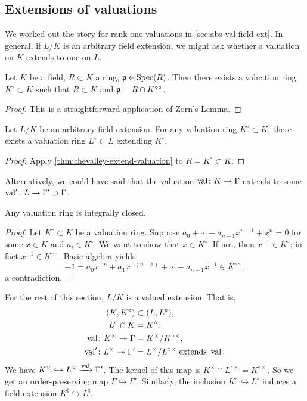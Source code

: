 \subsection{Extensions of valuations}

We worked out the story for rank-one valuations in 
\autoref{sec:abs-val-field-ext}. In general, if $L/K$ is an arbitrary field 
extension, we might ask whether a valuation on $K$ extends to one on $L$. 

\begin{theorem}[Chevalley]\label{thm:chevalley-extend-valuation}
Let $K$ be a field, $R\subset K$ a ring, $\mathfrak{p}\in \operatorname{Spec}(R)$. Then there exists a 
valuation ring $K^\circ\subset K$ such that $R\subset K$ and 
$\mathfrak{p}=R\cap K^{\circ\circ}$. 
\end{theorem}
\begin{proof}
This is a straightforward application of Zorn's Lemma.
\end{proof}

\begin{corollary}
Let $L/K$ be an arbitrary field extension. For any valuation ring 
$K^\circ\subset K$, there exists a valuation ring $L^\circ\subset L$ extending 
$K^\circ$. 
\end{corollary}
\begin{proof}
Apply \autoref{thm:chevalley-extend-valuation} to $R=K^\circ\subset K$. 
\end{proof}

Alternatively, we could have said that the valuation 
$\operatorname{val}\colon K\to \Gamma$ extends to some 
$\operatorname{val}'\colon L\to \Gamma'\supset \Gamma$. 

\begin{lemma}
Any valuation ring is integrally closed. 
\end{lemma}
\begin{proof}
Let $K^\circ\subset K$ be a valuation ring. Suppose 
$a_0+\cdots + a_{n-1} x^{n-1} + x^n = 0$ for some $x\in K$ and 
$a_i\in K^\circ$. We want to show that $x\in K^\circ$. If not, then 
$x^{-1}\in K^\circ$; in fact $x^{-1}\in K^{\circ\circ}$. Basic algebra 
yields 
\[
  -1 = a_0 x^{-n} + a_1 x^{-(n-1)} + \cdots + a_{n-1} x^{-1} \in K^{\circ\circ} ,
\]
a contradiction. 
\end{proof}

For the rest of this section, $L/K$ is a valued extension. That is, 
\begin{align*}
  (K,K^\circ) &\subset (L,L^\circ) ,\\
  L^\circ\cap K &= K^\circ ,\\
  \operatorname{val} \colon K^\times \twoheadrightarrow \Gamma &=K^\times/K^{\circ\times} ,\\
  \operatorname{val}' \colon L^\times \twoheadrightarrow \Gamma' &= L^\times/L^{\circ\times} \text{ extends }\operatorname{val} .
\end{align*}
We have $K^\times \hookrightarrow L^\times \xrightarrow{\operatorname{val}} \Gamma'$. 
The kernel of this map is $K^\times\cap L^{\circ\times} = K^{\circ\times}$. So 
we get an order-preserving map $\Gamma\hookrightarrow \Gamma'$. Similarly, the 
inclusion $K^\circ\hookrightarrow L^\circ$ induces a field extension 
$K^\natural\hookrightarrow L^\natural$. 

